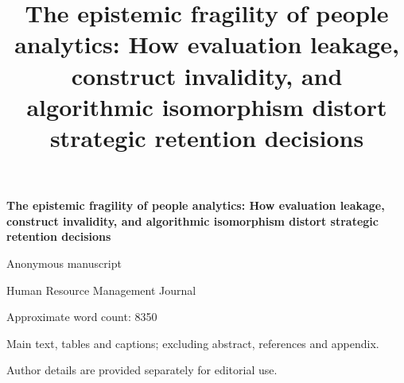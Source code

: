 \documentclass[12pt,a4paper]{article}
\title{The epistemic fragility of people analytics: How evaluation leakage, construct invalidity, and algorithmic isomorphism distort strategic retention decisions}
\author{}
\date{}
\newcommand{\ManuscriptWordCount}{8350}
\begin{document}
\doublespacing
\begin{titlepage}
\centering
\vspace*{1cm}
{\bfseries The epistemic fragility of people analytics: How evaluation leakage, construct invalidity, and algorithmic isomorphism distort strategic retention decisions\par}
\vspace{1cm}
Anonymous manuscript\par
Human Resource Management Journal\par
\vspace{1cm}
Approximate word count: \ManuscriptWordCount\par
\small Main text, tables and captions; excluding abstract, references and appendix.\par
\normalsize
\vfill
Author details are provided separately for editorial use.\par
\end{titlepage}
\end{document}
